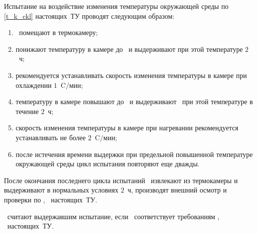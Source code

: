 Испытание на воздействие изменения температуры окружающей среды по \ref{t_k_ckl} настоящих~ТУ проводят следующим образом:
%
\begin{enumerate}
	\item \dut \ помещают в термокамеру;
	\item понижают температуру в камере до \kmmax \ и выдерживают при этой температуре $2$~ч;
	\item рекомендуется устанавливать скорость изменения температуры в камере при охлаждении $1$~\degree $\text{C}/\text{мин}$;
	\item температуру в камере повышают до \kpmax \ и выдерживают \dut \ при этой температуре в течение $2$~ч;
	\item скорость изменения температуры в камере при нагревании рекомендуется устанавливать не более $2$~\degree $\text{C}/\text{мин}$;
	\item после истечения времени выдержки при предельной повышенной температуре окружающей среды цикл испытания повторяют еще дважды.
\end{enumerate}

После окончания последнего цикла испытаний \dut \ извлекают из термокамеры и выдерживают в нормальных условиях $2$~ч, производят внешний осмотр и проверки по \treb, \trebafter \ настоящих~ТУ. 

\dut \  считают выдержавшим испытание, если \dut \ соответствует требованиям \treb, \trebafter \ настоящих~ТУ.